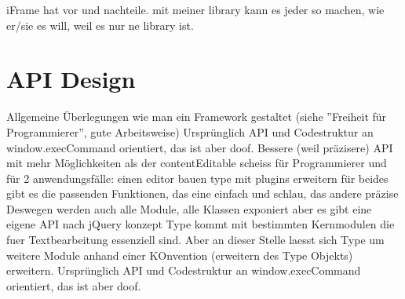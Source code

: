 iFrame hat vor und nachteile. mit meiner library kann es jeder so machen, wie er/sie es will, weil es nur ne library ist.


\section{API Design}

Allgemeine Überlegungen wie man ein Framework gestaltet (siehe ''Freiheit für Programmierer'', gute Arbeitsweise)
Ursprünglich API und Codestruktur an window.execCommand orientiert, das ist aber doof.
Bessere (weil präzisere) API mit mehr Möglichkeiten als der contentEditable scheiss
für Programmierer und für 2 anwendungsfälle:
einen editor bauen
type mit plugins erweitern
für beides gibt es die passenden Funktionen, das eine einfach und schlau, das andere präzise
Deswegen werden auch alle Module, alle Klassen exponiert aber es gibt eine eigene API nach jQuery konzept
Type kommt mit bestimmten Kernmodulen die fuer Textbearbeitung essenziell sind. Aber an dieser Stelle laesst sich Type um weitere Module anhand einer KOnvention (erweitern des Type Objekts) erweitern.
Ursprünglich API und Codestruktur an window.execCommand orientiert, das ist aber doof.
